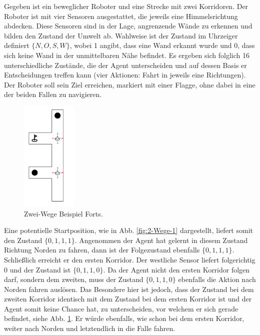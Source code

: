 Gegeben ist ein beweglicher Roboter und eine Strecke mit zwei Korridoren. Der Roboter ist mit vier Sensoren ausgestattet, die jeweils eine Himmelsrichtung abdecken. Diese Sensoren sind in der Lage, angrenzende Wände zu erkennen und bilden den Zustand der Umwelt ab. Wahlweise ist der Zustand im Uhrzeiger definiert $\{N, O, S, W\}$, wobei 1 angibt, dass eine Wand erkannt wurde und 0, dass sich keine Wand in der unmittelbaren Nähe befindet. Es ergeben sich folglich 16 unterschiedliche Zustände, die der Agent unterscheiden und auf dessen Basis er Entscheidungen treffen kann (vier Aktionen: Fahrt in jeweils eine Richtungen). Der Roboter soll sein Ziel erreichen, markiert mit einer Flagge, ohne dabei in eine der beiden Fallen zu navigieren.
\par
\begin{figure}
  \begin{center}
  \includegraphics[height=200px]{images/2passagesStart.png}  \end{center}
  \caption{Zwei-Wege Beispiel Forts.}
  \label{fig:2-Wege-2}
\end{figure}

Eine potentielle Startposition, wie in Abb. \ref{fig:2-Wege-1} dargestellt, liefert somit den Zustand $\{0, 1, 1, 1\}$. Angenommen der Agent hat gelernt in diesem Zustand Richtung Norden zu fahren, dann ist der Folgezustand ebenfalls $\{0, 1, 1, 1\}$. Schließlich erreicht er den ersten Korridor. Der westliche Sensor liefert folgerichtig 0 und der Zustand ist $\{0, 1, 1, 0\}$. Da der Agent nicht den ersten Korridor folgen darf, sondern dem zweiten, muss der Zustand $\{0, 1, 1, 0\}$ ebenfalls die Aktion \glqq nach Norden fahren\grqq{} auslösen. Das Besondere hier ist jedoch, dass der Zustand bei dem zweiten Korridor identisch mit dem Zustand bei dem ersten Korridor ist und der Agent somit keine Chance hat, zu unterscheiden, vor welchem er sich gerade befindet, siehe Abb. \ref{fig:2-Wege-2}. Er würde ebenfalls, wie schon bei dem ersten Korridor, weiter nach Norden und letztendlich in die Falle fahren.
\par 

